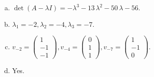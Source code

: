 \begin{questions}
\begin{solution}
\begin{enumerate}[(a)]
\item $\det(A-\lambda I)=-{\lambda}^{3} - 13 \, {\lambda}^{2} - 50 \, {\lambda} - 56$.
\item ${\lambda}_1=-2, {\lambda}_2=-4, {\lambda}_3=-7$.
\item $v_{-2}=\left(\begin{array}{r}
1 \\
-1 \\
-1
\end{array}\right), v_{-4}=\left(\begin{array}{r}
0 \\
1 \\
1
\end{array}\right), v_{-7}=\left(\begin{array}{r}
1 \\
-1 \\
0
\end{array}\right)$.
\item Yes.
\end{enumerate}
\end{solution}

\end{questions}

\newpage


\begin{center}
\end{center}

